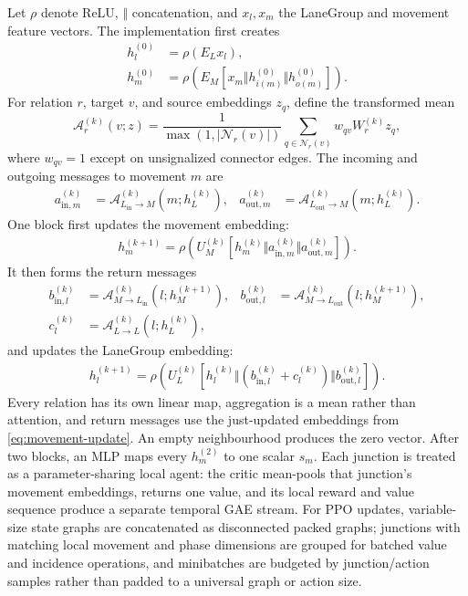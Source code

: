 \documentclass[10pt,a4paper]{article}
\begin{document}
Let \(\rho\) denote ReLU, \(\Vert\) concatenation, and \(x_l,x_m\) the LaneGroup and movement feature vectors.
The implementation first creates
\begin{align}
h_l^{(0)} &= \rho(E_Lx_l),\\
h_m^{(0)} &= \rho\!\left(E_M[x_m\Vert h_{i(m)}^{(0)}\Vert h_{o(m)}^{(0)}]\right).
\end{align}
For relation \(r\), target \(v\), and source embeddings \(z_q\), define the transformed mean
\[
\mathcal A_r^{(k)}(v;z)=
\frac{1}{\max(1,|\mathcal N_r(v)|)}
\sum_{q\in\mathcal N_r(v)} w_{qv}W_r^{(k)}z_q,
\]
where \(w_{qv}=1\) except on unsignalized connector edges.
The incoming and outgoing messages to movement \(m\) are
\begin{align}
a_{\mathrm{in},m}^{(k)}&=\mathcal A_{L_{\mathrm{in}}\to M}^{(k)}(m;h_L^{(k)}),&
a_{\mathrm{out},m}^{(k)}&=\mathcal A_{L_{\mathrm{out}}\to M}^{(k)}(m;h_L^{(k)}).
\end{align}
One block first updates the movement embedding:
\begin{align}
h_m^{(k+1)}=\rho\!\left(U_M^{(k)}
[h_m^{(k)}\Vert a_{\mathrm{in},m}^{(k)}\Vert a_{\mathrm{out},m}^{(k)}]\right).
\label{eq:movement-update}
\end{align}
It then forms the return messages
\begin{align}
b_{\mathrm{in},l}^{(k)}&=\mathcal A_{M\to L_{\mathrm{in}}}^{(k)}(l;h_M^{(k+1)}),&
b_{\mathrm{out},l}^{(k)}&=\mathcal A_{M\to L_{\mathrm{out}}}^{(k)}(l;h_M^{(k+1)}),\\
c_l^{(k)}&=\mathcal A_{L\to L}^{(k)}(l;h_L^{(k)}),
\end{align}
and updates the LaneGroup embedding:
\begin{align}
h_l^{(k+1)}=\rho\!\left(U_L^{(k)}
[h_l^{(k)}\Vert(b_{\mathrm{in},l}^{(k)}+c_l^{(k)})\Vert b_{\mathrm{out},l}^{(k)}]\right).
\label{eq:lane-update}
\end{align}
Every relation has its own linear map, aggregation is a mean rather than attention, and return messages use the just-updated embeddings from \eqref{eq:movement-update}.
An empty neighbourhood produces the zero vector.
After two blocks, an MLP maps every \(h_m^{(2)}\) to one scalar \(s_m\).
Each junction is treated as a parameter-sharing local agent: the critic mean-pools that junction's movement embeddings, returns one value, and its local reward and value sequence produce a separate temporal GAE stream.
For PPO updates, variable-size state graphs are concatenated as disconnected packed graphs; junctions with matching local movement and phase dimensions are grouped for batched value and incidence operations, and minibatches are budgeted by junction/action samples rather than padded to a universal graph or action size.
\end{document}
